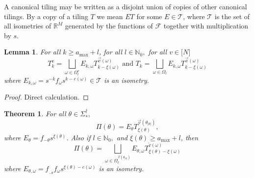 \documentclass{amsproc}
\newtheorem{theorem}{Theorem}
\theoremstyle{plain}
\newtheorem{lemma}{Lemma}
\theoremstyle{definition}
\numberwithin{equation}{section}
\begin{document}
A canonical tiling may be written as a disjoint union of copies of other
canonical tilings. By a copy of a tiling $T$ we mean $ET$ for some $E\in 
\mathcal{T}$, where $\mathcal{T}$ is the set of all isometries of $\mathbb{R}%
^{M}$ generated by the functions of $\mathcal{F}$ together with
multiplication by $s.$

\begin{lemma}
\label{lem:canonical}For all $k\geq a_{\max}+l$, for all $l\in\mathbb{N}%
_{0}, $ for all $v\in\lbrack N]$ 
\begin{equation*}
T_{k}^{v}=\bigsqcup\limits_{\omega\in\Omega_{l}^{v}}E_{k,\omega}T_{k-\xi%
\left( \omega\right) }^{\overrightarrow{v}\left( \omega\right) }\text{ and }%
T_{k}=\bigsqcup\limits_{\omega\in\Omega_{l}}E_{k,\omega}T_{k-\xi\left(
\omega\right) }^{\overrightarrow{v}\left( \omega\right) }
\end{equation*}
where $E_{k,\omega}=s^{-k}f_{\omega}s^{k-e(\omega)}\in\mathcal{T}$ is an
isometry.
\end{lemma}

\begin{proof}
Direct calculation.
\end{proof}

\begin{theorem}
\label{piusingts}For all $\theta\in\Sigma_{\ast}^{\dag},$%
\begin{equation*}
\Pi(\theta)=E_{\theta}T_{\xi(\theta)}^{\overrightarrow{v}(\theta_{\left\vert
\theta\right\vert })},
\end{equation*}
where $E_{\theta}=f_{-\theta}s^{\xi(\theta)}$. Also if $l\in\mathbb{N}_{0},$
and $\xi(\theta)\geq a_{\max}+l$, then%
\begin{equation*}
\Pi(\theta)=\bigsqcup\limits_{\omega\in\Omega_{l}^{\overrightarrow{v}%
(\theta_{\left\vert \theta\right\vert })}}E_{\theta,\omega}T_{\xi(\theta
)-\xi\left( \omega\right) }^{\overleftarrow{v}\left( \omega\right) }
\end{equation*}
where $E_{\theta,\omega}=f_{_{-\theta}}f_{\omega}s^{\xi(\theta)-e(\omega)}$
is an isometry.
\end{theorem}
\end{document}
